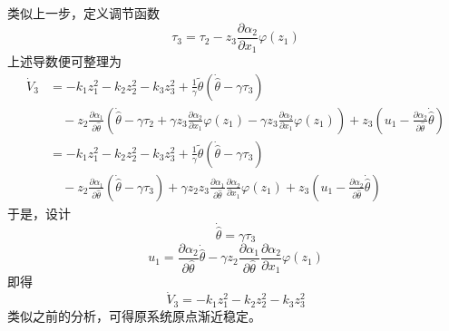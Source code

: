 类似上一步，定义调节函数\[\tau_3=\tau_2-z_3\frac{\partial \alpha_2}{\partial x_1}\varphi(z_1)\]
上述导数便可整理为
\begin{align*}
    \dot{V}_3 &=-k_1z_1^2-k_2z_2^2-k_3z_3^2+\frac{1}{\gamma}\tilde{\theta}(\dot{\hat{\theta}}-\gamma \tau_3)\\
    &\quad -z_2\frac{\partial
  \alpha_1}{\partial \hat{\theta} }\left(\dot{\hat{\theta}}-\gamma\tau_2+\gamma z_3 \frac{\partial \alpha_2}{\partial x_1}\varphi(z_1)-\gamma z_3\frac{\partial \alpha_2}{\partial x_1}\varphi(z_1)\right) +z_3\left(u_1- \frac{\partial\alpha_2}{\partial \hat{\theta}}\dot{\hat{\theta}}\right)\\
&=-k_1z_1^2-k_2z_2^2-k_3z_3^2+\frac{1}{\gamma}\tilde{\theta}(\dot{\hat{\theta}}-\gamma \tau_3)\\
    &\quad -z_2\frac{\partial
  \alpha_1}{\partial \hat{\theta} }(\dot{\hat{\theta}}-\gamma\tau_3)+\gamma z_2z_3\frac{\partial
  \alpha_1}{\partial \hat{\theta} }\frac{\partial \alpha_2}{\partial x_1}\varphi(z_1) +z_3\left(u_1- \frac{\partial\alpha_2}{\partial \hat{\theta}}\dot{\hat{\theta}}\right)
\end{align*}
于是，设计
\[\dot{\hat{\theta}}=\gamma\tau_3\]
\[u_1=\frac{\partial\alpha_2}{\partial \hat{\theta}}\dot{\hat{\theta}}-\gamma z_2\frac{\partial
  \alpha_1}{\partial \hat{\theta} }\frac{\partial \alpha_2}{\partial x_1}\varphi(z_1)\]
即得\[\dot{V}_3 =-k_1z_1^2-k_2z_2^2-k_3z_3^2\]
类似之前的分析，可得原系统原点渐近稳定。